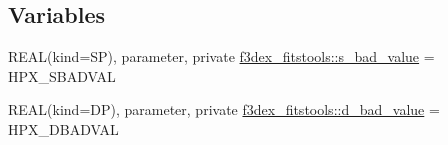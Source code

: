 \subsection*{Variables}
\begin{DoxyCompactItemize}
\item 
REAL(kind=SP), parameter, private \hyperlink{namespacef3dex__fitstools_a7841ef704a851792da5858a872caa0e4}{f3dex\_\-fitstools::s\_\-bad\_\-value} = HPX\_\-SBADVAL
\item 
REAL(kind=DP), parameter, private \hyperlink{namespacef3dex__fitstools_ae70f4f4f98f16a18e429bfd5f014d650}{f3dex\_\-fitstools::d\_\-bad\_\-value} = HPX\_\-DBADVAL
\end{DoxyCompactItemize}
